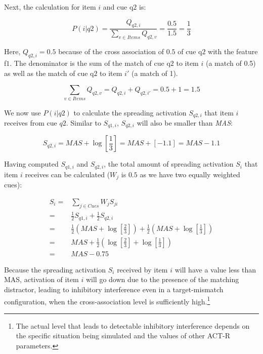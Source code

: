 \documentclass{cambridge7A}\usepackage[]{graphicx}\usepackage[]{color}
\begin{document}
\begin{enumerate}
Next, the calculation for item $i$ and cue q$2$ is:

\begin{equation} \label{eq:newfannoxassoc4}
	P(i|q2) = \frac{Q_{q2,i}}{\sum\limits_{v\in Items} Q_{q2,v}} = \frac{0.5}{1.5} = \frac{1}{3}
\end{equation}

Here, $Q_{q2,i} = 0.5$ because of the cross  association of $0.5$ of  cue q$2$ with the feature f$1$. The denominator is the sum of the match of cue q$2$ to item $i$ (a match of 0.5) as well as the match of cue q$2$ to item $i'$ (a match of 1).

\begin{equation}
\sum\limits_{v\in Items} Q_{q2,v} = Q_{q2,i} + Q_{q2,i'} = 0.5 + 1 = 1.5
\end{equation}

We now use $P(i|q2)$ to calculate the  spreading activation  $S_{q2,i}$ that item $i$ receives from cue $q2$. Similar to  $S_{q1,i}$, $S_{q2,i}$ will also be smaller than \textit{MAS}: 

\begin{equation}
S_{q2,i} = \textit{MAS} + \log \left[\frac{1}{3} \right] = \textit{MAS} + [-1.1] = \textit{MAS} - 1.1 
\end{equation}

Having computed $S_{q1,i}$ and $S_{q2,i}$, the total amount of spreading activation $S_i$ that item $i$ receives can be calculated ($W_j$ is $0.5$ as we have two equally weighted cues):

\begin{equation}
\begin{split}
      S_i =& \sum\limits_{j\in Cues} W_{j} S_{ji} \\
          =& \frac{1}{2} S_{q1,i} + \frac{1}{2} S_{q2,i}\\
          =& \frac{1}{2}\left(\textit{MAS} + \log \left[\frac{2}{3}\right]\right) + \frac{1}{2}\left(\textit{MAS} + \log \left[\frac{1}{3}\right]\right)\\
          =& \textit{MAS} +  \frac{1}{2}\left(\log \left[\frac{2}{3}\right] + \log \left[\frac{1}{3}\right]\right) \\
          =& \textit{MAS} - 0.75
\end{split}
\end{equation}

\label{crossasspageref}
Because the  spreading activation $S_i$ received by item $i$ will have a value less than MAS, activation of item $i$ will go down due to the presence of the matching distractor, leading to inhibitory interference even in a target-mismatch configuration, when the cross-association level is sufficiently high.\footnote{The actual level that leads to detectable inhibitory interference depends on the specific situation being simulated and the values of other ACT-R parameters.}
\end{enumerate}
\end{document}
